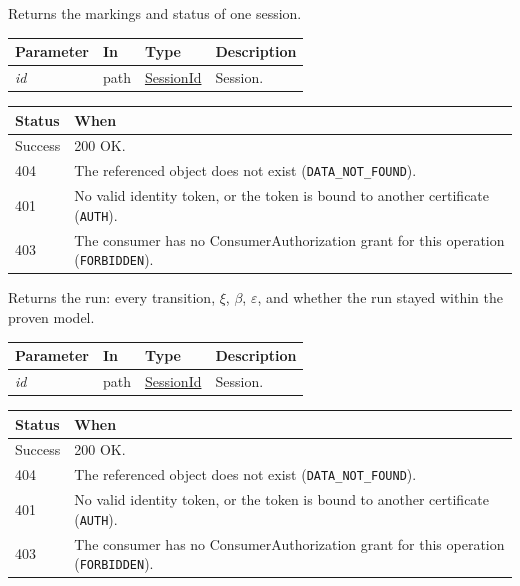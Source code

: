 \documentclass[a4paper]{arrowhead}
\newcommand{\fparam}[1]{\textit{\textcolor{ArrowheadBlue}{#1}}}
\newcommand{\pref}[1]{{\textcolor{ArrowheadGrey}{\hyperref[sec:model:primitives:#1]{#1}}}}
\begin{document}
Returns the markings and status of one session.

{\small
\begin{longtable}{|p{3.0cm}|p{1.4cm}|p{3.2cm}|p{8.2cm}|}

\hline
\rowcolor{gray!33} Parameter & In & Type & Description \\ \hline
\endhead
\fparam{id} & path & \pref{SessionId} & Session. \\ \hline
\end{longtable}
}


{\small
\begin{longtable}{|p{2.0cm}|p{13.8cm}|}

\hline
\rowcolor{gray!33} Status & When \\ \hline
\endhead
Success & 200 OK. \\ \hline
404 & The referenced object does not exist (\texttt{DATA\_\allowbreak{}NOT\_\allowbreak{}FOUND}). \\ \hline
401 & No valid identity token, or the token is bound to another certificate (\texttt{AUTH}). \\ \hline
403 & The consumer has no ConsumerAuthorization grant for this operation (\texttt{FORBIDDEN}). \\ \hline
\end{longtable}
}

Returns the run: every transition, $\xi$, $\beta$, $\varepsilon$, and whether the run stayed within the proven model.

{\small
\begin{longtable}{|p{3.0cm}|p{1.4cm}|p{3.2cm}|p{8.2cm}|}

\hline
\rowcolor{gray!33} Parameter & In & Type & Description \\ \hline
\endhead
\fparam{id} & path & \pref{SessionId} & Session. \\ \hline
\end{longtable}
}


{\small
\begin{longtable}{|p{2.0cm}|p{13.8cm}|}

\hline
\rowcolor{gray!33} Status & When \\ \hline
\endhead
Success & 200 OK. \\ \hline
404 & The referenced object does not exist (\texttt{DATA\_\allowbreak{}NOT\_\allowbreak{}FOUND}). \\ \hline
401 & No valid identity token, or the token is bound to another certificate (\texttt{AUTH}). \\ \hline
403 & The consumer has no ConsumerAuthorization grant for this operation (\texttt{FORBIDDEN}). \\ \hline
\end{longtable}
}
\end{document}
